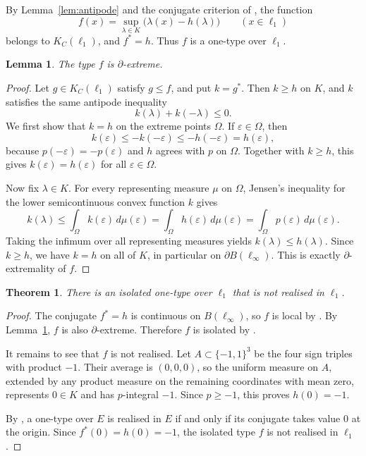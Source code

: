 \documentclass[11pt]{article}
\newtheorem{theorem}{Theorem}
\newtheorem{lemma}{Lemma}
\newcommand{\eps}{\varepsilon}
\newcommand{\KC}{K_C}
\newcommand{\bd}{\partial}
\begin{document}
By Lemma~\ref{lem:antipode} and the conjugate criterion of \cite[Lemma
4.12]{BYH}, the function
\[
  f(x)=\sup_{\lambda\in K}\bigl(\lambda(x)-h(\lambda)\bigr)
  \qquad (x\in\ell_1)
\]
belongs to \(\KC(\ell_1)\), and \(f^*=h\).  Thus \(f\) is a one-type over
\(\ell_1\).

\begin{lemma}
\label{lem:extreme}
The type \(f\) is \(\bd\)-extreme.
\end{lemma}

\begin{proof}
Let \(g\in\KC(\ell_1)\) satisfy \(g\leq f\), and put \(k=g^*\).  Then
\(k\geq h\) on \(K\), and \(k\) satisfies the same antipode inequality
\[
  k(\lambda)+k(-\lambda)\leq 0.
\]
We first show that \(k=h\) on the extreme points \(\Omega\).  If
\(\eps\in\Omega\), then
\[
  k(\eps)\leq -k(-\eps)\leq -h(-\eps)=h(\eps),
\]
because \(p(-\eps)=-p(\eps)\) and \(h\) agrees with \(p\) on \(\Omega\).
Together with \(k\geq h\), this gives \(k(\eps)=h(\eps)\) for all
\(\eps\in\Omega\).

Now fix \(\lambda\in K\).  For every representing measure \(\mu\) on
\(\Omega\), Jensen's inequality for the lower semicontinuous convex function
\(k\) gives
\[
  k(\lambda)\leq \int_\Omega k(\eps)\,d\mu(\eps)
  =\int_\Omega h(\eps)\,d\mu(\eps)
  =\int_\Omega p(\eps)\,d\mu(\eps).
\]
Taking the infimum over all representing measures yields \(k(\lambda)\leq
h(\lambda)\).  Since \(k\geq h\), we have \(k=h\) on all of \(K\), in
particular on \(\bd B(\ell_\infty)\).  This is exactly \(\bd\)-extremality of
\(f\).
\end{proof}

\begin{theorem}
There is an isolated one-type over \(\ell_1\) that is not realised in \(\ell_1\).
\end{theorem}

\begin{proof}
The conjugate \(f^*=h\) is continuous on \(B(\ell_\infty)\), so \(f\) is local
by \cite[Lemma 5.2]{BYH}.  By Lemma~\ref{lem:extreme}, \(f\) is also
\(\bd\)-extreme.  Therefore \(f\) is isolated by \cite[Theorem 5.7]{BYH}.

It remains to see that \(f\) is not realised.  Let \(A\subset\{-1,1\}^3\) be
the four sign triples with product \(-1\).  Their average is \((0,0,0)\), so
the uniform measure on \(A\), extended by any product measure on the remaining
coordinates with mean zero, represents \(0\in K\) and has \(p\)-integral
\(-1\).  Since \(p\geq -1\), this proves \(h(0)=-1\).

By \cite[Lemma 4.14]{BYH}, a one-type over \(E\) is realised in \(E\) if and
only if its conjugate takes value \(0\) at the origin.  Since \(f^*(0)=h(0)=-1\),
the isolated type \(f\) is not realised in \(\ell_1\).
\end{proof}
\end{document}
